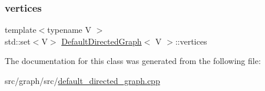 \mbox{\label{classDefaultDirectedGraph_ab5975523e831ac6142652b29887fd3b8}} 
\subsubsection{\texorpdfstring{vertices}{vertices}}
{\footnotesize\ttfamily template$<$typename V $>$ \\
std\+::set$<$V$>$ \hyperlink{classDefaultDirectedGraph}{Default\+Directed\+Graph}$<$ V $>$\+::vertices\hspace{0.3cm}{\ttfamily [protected]}}



The documentation for this class was generated from the following file\+:\begin{DoxyCompactItemize}
\item 
src/graph/src/\hyperlink{default__directed__graph_8cpp}{default\+\_\+directed\+\_\+graph.\+cpp}\end{DoxyCompactItemize}
